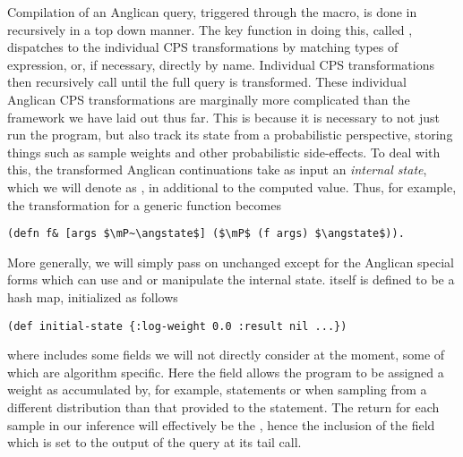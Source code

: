 Compilation of an Anglican query, triggered through the \query macro, is done in recursively
in a top down manner.  The key function in doing this, called ,
dispatches to the individual CPS transformations by matching types of expression, or, if necessary,
directly by name.  Individual CPS transformations then recursively call 
until the full query is transformed.  
These individual Anglican CPS transformations are marginally more complicated than the
framework we have laid out thus far.  This is because it is necessary to not just run the
program, but also track its state from a probabilistic perspective, storing things such
as sample weights and other probabilistic side-effects.  To deal with this, the transformed Anglican
continuations take as input an \emph{internal state}, which we will denote as \angstate,
in additional to the computed value.
Thus, for example, the transformation for a generic function  becomes
\begin{lstlisting}[basicstyle=\ttfamily\small,frame=none]
  (defn f& [args $\mP~\angstate$] ($\mP$ (f args) $\angstate$)).
\end{lstlisting}\vspace{-8pt}
More generally, we will simply pass on \angstate unchanged except for the Anglican
special forms which can use and or manipulate the internal state.  \angstate itself
is defined to be a hash map, initialized as follows
\begin{lstlisting}[basicstyle=\ttfamily\small,frame=none]
  (def initial-state {:log-weight 0.0 :result nil ...})
\end{lstlisting}\vspace{-8pt}
where  includes some fields we will not directly consider at the moment, some of which are algorithm
specific.
Here the field  allows the program to be assigned a
weight as accumulated by, for example, \observe statements or 
when sampling from a different distribution than that provided to the \sample statement.
The return for each sample in our inference will effectively be the \angstate, hence the inclusion
of the  field which is set to the output of the query at its tail call.

